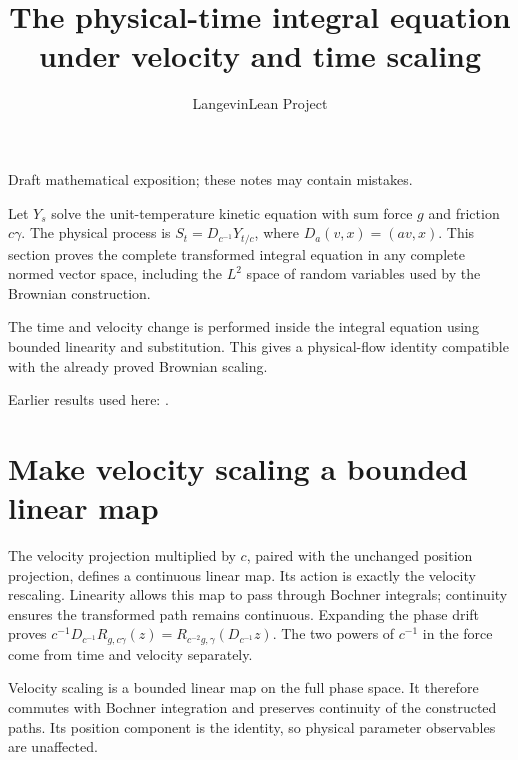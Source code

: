 \documentclass[11pt,a4paper]{article}
\title{\texorpdfstring{The physical-time integral equation under velocity and time scaling}{The physical-time integral equation under velocity and time scaling}}
\author{LangevinLean Project}
\date{}
\begin{document}
\maketitle
Draft mathematical exposition; these notes may contain mistakes.


Let \(Y_s\) solve the unit-temperature kinetic equation with sum force \(g\) and friction \(c\gamma\). The physical process is \(S_t=D_{c^{-1}}Y_{t/c}\), where \(D_a(v,x)=(av,x)\). This section proves the complete transformed integral equation in any complete normed vector space, including the \(L^{2}\) space of random variables used by the Brownian construction.



The time and velocity change is performed inside the integral equation using bounded linearity and substitution. This gives a physical-flow identity compatible with the already proved Brownian scaling.



Earlier results used here: \cite[Section~3.1]{LangevinLean2026Kinetic}.

\section{\texorpdfstring{Make velocity scaling a bounded linear map}{Make velocity scaling a bounded linear map}}


The velocity projection multiplied by \(c\), paired with the unchanged position projection, defines a continuous linear map. Its action is exactly the velocity rescaling. Linearity allows this map to pass through Bochner integrals; continuity ensures the transformed path remains continuous. Expanding the phase drift proves \(c^{-1}D_{c^{-1}}R_{g,c\gamma}(z)=R_{c^{-2}g,\gamma}(D_{c^{-1}}z)\). The two powers of \(c^{-1}\) in the force come from time and velocity separately.



Velocity scaling is a bounded linear map on the full phase space. It therefore commutes with Bochner integration and preserves continuity of the constructed paths. Its position component is the identity, so physical parameter observables are unaffected.
\end{document}
